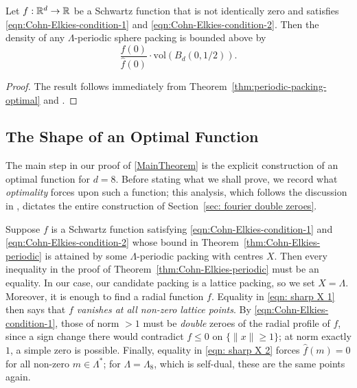 \begin{theorem}\label{thm:Cohn-Elkies-general}\leanok
  Let $f:\mathbb{R}^d\to\mathbb{R}$ be a Schwartz function that is not identically zero and satisfies \eqref{eqn:Cohn-Elkies-condition-1} and \eqref{eqn:Cohn-Elkies-condition-2}. Then the density of any $\Lambda$-periodic sphere packing is bounded above by $$\frac{f(0)}{\widehat{f}(0)}\cdot \mathrm{vol}(B_d(0,1/2)).$$
\end{theorem}
\begin{proof}\leanok
  The result follows immediately from Theorem~\ref{thm:periodic-packing-optimal} and .
\end{proof}

\subsection{The Shape of an Optimal Function}

The main step in our proof of \cref{MainTheorem} is the explicit construction of an optimal function for $d = 8$. Before stating what we shall prove, we record what \emph{optimality} forces upon such a function; this analysis, which follows the discussion in \cite[p.~8]{CohnICM}, dictates the entire construction of Section~\ref{sec: fourier double zeroes}.

Suppose $f$ is a Schwartz function satisfying \eqref{eqn:Cohn-Elkies-condition-1} and \eqref{eqn:Cohn-Elkies-condition-2} whose bound in Theorem~\ref{thm:Cohn-Elkies-periodic} is attained by some $\Lambda$-periodic packing with centres $X$. Then every inequality in the proof of Theorem~\ref{thm:Cohn-Elkies-periodic} must be an equality. In our case, our candidate packing is a lattice packing, so we set $X = \Lambda$. Moreover, it is enough to find a radial function $f$. Equality in \eqref{eqn: sharp X 1} then says that \emph{$f$ vanishes at all non-zero lattice points}. By \eqref{eqn:Cohn-Elkies-condition-1}, those of norm $> 1$ must be \emph{double} zeroes of the radial profile of $f$, since a sign change there would contradict $f \leq 0$ on $\{\|x\| \geq 1\}$; at norm exactly $1$, a simple zero is possible. Finally, equality in \eqref{eqn: sharp X 2} forces $\widehat{f}(m) = 0$ for all non-zero $m \in \Lambda^*$; for $\Lambda = \Lambda_8$, which is self-dual, these are the same points again.

